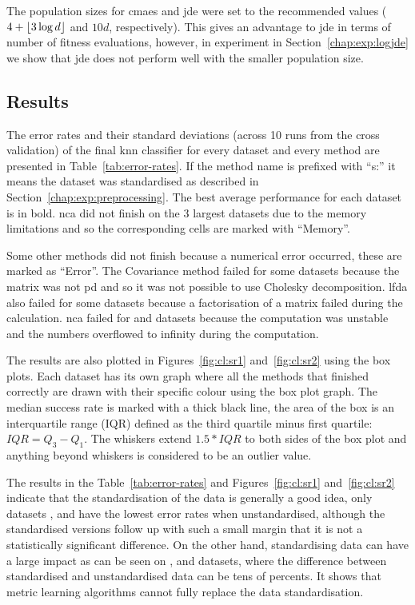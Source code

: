 The population sizes for \ac{cmaes} and \ac{jde} were set to the recommended values ($4+\lfloor3\log{d}\rfloor$ and $10d$, respectively). This gives an advantage to \ac{jde} in terms of number of fitness evaluations, however, in experiment in Section~\ref{chap:exp:logjde} we show that \ac{jde} does not perform well with the smaller population size.

\subsection{Results}

The error rates and their standard deviations (across 10 runs from the cross validation) of the final \ac{knn} classifier for every dataset and every method are presented in Table~\ref{tab:error-rates}. If the method name is prefixed with ``s:'' it means the dataset was standardised as described in Section~\ref{chap:exp:preprocessing}. The best average performance for each dataset is in bold. \ac{nca} did not finish on the 3 largest datasets due to the memory limitations and so the corresponding cells are marked with ``Memory''.

Some other methods did not finish because a numerical error occurred, these are marked as ``Error''. The Covariance method failed for some datasets because the matrix was not \ac{pd} and so it was not possible to use Cholesky decomposition. \ac{lfda} also failed for some datasets because a factorisation of a matrix failed during the calculation. \ac{nca} failed for  and  datasets because the computation was unstable and the numbers overflowed to infinity during the computation.



The results are also plotted in Figures~\ref{fig:cl:sr1} and~\ref{fig:cl:sr2} using the box plots. Each dataset has its own graph where all the methods that finished correctly are drawn with their specific colour using the box plot graph. The median success rate is marked with a thick black line, the area of the box is an interquartile range (IQR) defined as the third quartile minus first quartile: $IQR = Q_3 - Q_1$. The whiskers extend $1.5*IQR$ to both sides of the box plot and anything beyond whiskers is considered to be an outlier value.

The results in the Table~\ref{tab:error-rates} and Figures~\ref{fig:cl:sr1} and~\ref{fig:cl:sr2} indicate that the standardisation of the data is generally a good idea, only datasets ,  and  have the lowest error rates when unstandardised, although the standardised versions follow up with such a small margin that it is not a statistically significant difference. On the other hand, standardising data can have a large impact as can be seen on ,  and  datasets, where the difference between standardised and unstandardised data can be tens of percents. It shows that metric learning algorithms cannot fully replace the data standardisation.

